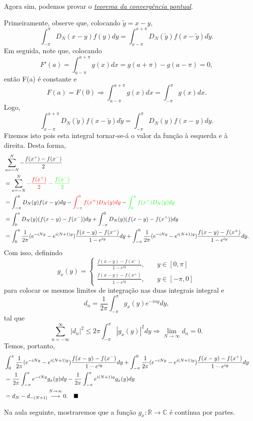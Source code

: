 \documentclass[../pde_notes.tex]{subfiles}
\begin{document}
Agora sim, podemos provar o \hyperlink{ponintwise_convergence}{\textit{teorema da convergência pontual}}.
\begin{proof*}
	Primeiramente, observe que, colocando \(\tilde{y}=x-y\),
	\[
		\int_{-\pi }^{\pi }D_{N}(x-y)f(y)dy=\int_{x-\pi }^{x+\pi }D_{N}(\tilde{y})f(x-\tilde{y})d\tilde{y}.
	\]
	Em seguida, note que, colocando
	\[
		F'(a)=\int_{a-\pi }^{a+\pi }g(x)dx=g(a+\pi )-g(a-\pi )=0,
	\]
	então F(a) é constante e
	\[
		F(a)=F(0) \Rightarrow \int_{a-\pi }^{a+\pi }g(x)dx=\int_{-\pi }^{\pi }g(x)dx.
	\]
	Logo,
	\[
		\int_{x-\pi }^{x+\pi }D_{N}(\tilde{y})f(x-\tilde{y})d\tilde{y}=\int_{-\pi }^{\pi }D_{N}(y)f(x-y)dy.
	\]
	Fizemos isto pois esta integral tornar-se-á o valor da função à esquerda e à direita. Desta forma,
	\begin{align*}
		 & \sum\limits_{n=-N}^{N}-\frac{f(x^{+})-f(x^{-})}{2}                                                                                                                                   \\
		 & = \sum\limits_{n=-N}^{N}-{\color{red}\frac{f(x^{+})}{2}}-{\color{green}\frac{f(x^{-})}{2}}                                                                                           \\
		 & =\int_{-\pi }^{\pi }D_{N}(y)f(x-y)dy - {\color{red}\int_{-\pi }^{0}f(x^{+})D_{N}(y)dy}-{\color{green}\int_{0}^{\pi }f(x^{-})D_{N}(y)dy}                                              \\
		 & = \int_{0}^{\pi }D_{N}(y)(f(x-y)-f(x^{-}))dy + \int_{-\pi }^{0}D_{N}(y)(f(x-y)-f(x^{+}))dy                                                                                           \\
		 & = \int_{0}^{\pi }\frac{1}{2 \pi }(e^{-iNy}-e^{i(N+1)y})\frac{f(x-y)-f(x^{-})}{1-e^{iy}}dy + \int_{-\pi }^{0}\frac{1}{2\pi }(e^{-iNy}-e^{i(N+1)y})\frac{f(x-y)-f(x^{+})}{1-e^{iy}}dy.
	\end{align*}
	Com isso, definindo
	\[
		g_{x}(y) = \left\{\begin{array}{ll}
			\frac{f(x-y)-f(x^{-})}{1-e^{iy}}, & \quad y\in [0, \pi ] \\
			\frac{f(x-y)-f(x^{+})}{1-e^{iy}}, & \quad y\in [-\pi, 0]
		\end{array}\right.
	\]
	para colocar os mesmos limites de integração nas duas integrais integral e
	\[
		d_{n}=\frac{1}{2\pi }\int_{-\pi }^{\pi }g_{x}(y)e^{-iny}dy,
	\]
	tal que
	\[
		\sum\limits_{n=-\infty}^{\infty}|d_{n}|^{2}\leq 2\pi \int_{-\pi }^{\pi }|g_{x}(y)|^{2}dy \Rightarrow \lim_{N\to \infty}d_{n}=0.
	\]
	Temos, portanto,
	\begin{align*}
		 & \int_{0}^{\pi }\frac{1}{2 \pi }(e^{-iNy}-e^{i(N+1)y})\frac{f(x-y)-f(x^{-})}{1-e^{iy}}dy + \int_{-\pi }^{0}\frac{1}{2\pi }(e^{-iNy}-e^{i(N+1)y})\frac{f(x-y)-f(x^{+})}{1-e^{iy}}dy \\
		 & = \frac{1}{2\pi } \int_{-\pi }^{\pi }e^{-iNy}g_{x}(y)dy - \frac{1}{2\pi }\int_{-\pi }^{\pi }e^{i(N+1)y}g_{x}(y)dy                                                                 \\
		 & =d_{N}-d_{-(N+1)} \overbracket[0pt]{\longrightarrow}^{N\to \infty}0. \quad \text{\qedsymbol}
	\end{align*}
\end{proof*}
Na aula seguinte, mostraremos que a função \(g_{x}:\mathbb{R}\rightarrow \mathbb{C}\) é contínua por partes.
\end{document}
